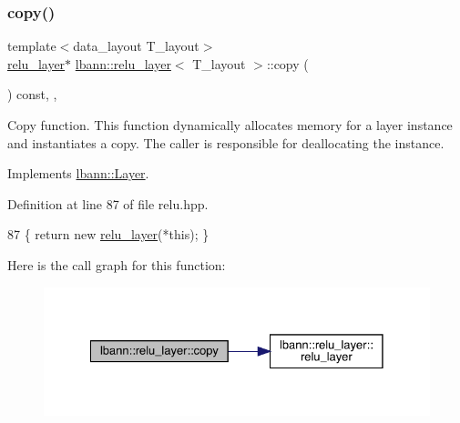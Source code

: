 \subsubsection{\texorpdfstring{copy()}{copy()}}
{\footnotesize\ttfamily template$<$data\+\_\+layout T\+\_\+layout$>$ \\
\hyperlink{classlbann_1_1relu__layer}{relu\+\_\+layer}$\ast$ \hyperlink{classlbann_1_1relu__layer}{lbann\+::relu\+\_\+layer}$<$ T\+\_\+layout $>$\+::copy (\begin{DoxyParamCaption}{ }\end{DoxyParamCaption}) const\hspace{0.3cm}{\ttfamily [inline]}, {\ttfamily [override]}, {\ttfamily [virtual]}}

Copy function. This function dynamically allocates memory for a layer instance and instantiates a copy. The caller is responsible for deallocating the instance. 

Implements \hyperlink{classlbann_1_1Layer_af420f22bbac801c85483ade84588a23f}{lbann\+::\+Layer}.



Definition at line 87 of file relu.\+hpp.


\begin{DoxyCode}
87 \{ \textcolor{keywordflow}{return} \textcolor{keyword}{new} \hyperlink{classlbann_1_1relu__layer_af4739658d074a62cd71ce0ca7e791c06}{relu\_layer}(*\textcolor{keyword}{this}); \}
\end{DoxyCode}
Here is the call graph for this function\+:\nopagebreak
\begin{figure}[H]
\begin{center}
\leavevmode
\includegraphics[width=328pt]{classlbann_1_1relu__layer_af17be85b90887cf3d413fd21e7e20b5c_cgraph}
\end{center}
\end{figure}
\mbox{\label{classlbann_1_1relu__layer_a682fbf36187cb7f985581b5d4095ae14}} 
